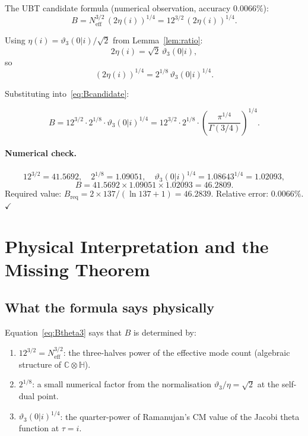 \documentclass[12pt,a4paper]{article}
\theoremstyle{remark}
\begin{document}
The UBT candidate formula (numerical observation, accuracy $0.0066\%$):
\begin{equation}
  B = N_{\mathrm{eff}}^{3/2}\,(2\eta(i))^{1/4}
  = 12^{3/2}\,(2\eta(i))^{1/4}.
  \label{eq:Bcandidate}
\end{equation}

Using $\eta(i) = \vartheta_3(0|i)/\sqrt{2}$ from Lemma~\ref{lem:ratio}:
\begin{equation}
  2\eta(i) = \sqrt{2}\,\vartheta_3(0|i),
\end{equation}
so
\begin{equation}
  (2\eta(i))^{1/4} = 2^{1/8}\,\vartheta_3(0|i)^{1/4}.
\end{equation}

Substituting into~\eqref{eq:Bcandidate}:
\begin{tcolorbox}[colback=blue!3!white, colframe=blue!55!black,
  title={Algebraic rewriting of the $B$-formula}]
\begin{equation}
  \boxed{
  B = 12^{3/2}\cdot 2^{1/8}\cdot\vartheta_3(0|i)^{1/4}
    = 12^{3/2}\cdot 2^{1/8}\cdot
      \left(\frac{\pi^{1/4}}{\Gamma(3/4)}\right)^{1/4}.
  }
  \label{eq:Btheta3}
\end{equation}
\end{tcolorbox}

\paragraph{Numerical check.}
\[
12^{3/2} = 41.5692,
\quad
2^{1/8} = 1.09051,
\quad
\vartheta_3(0|i)^{1/4} = 1.08643^{1/4} = 1.02093,
\]
\[
B = 41.5692 \times 1.09051 \times 1.02093 = 46.2809.
\]
Required value: $B_{\mathrm{req}} = 2\times137/(\ln 137+1) = 46.2839$.
Relative error: $0.0066\%$. $\checkmark$

\section{Physical Interpretation and the Missing Theorem}
\label{sec:missing}

\subsection{What the formula says physically}

Equation~\eqref{eq:Btheta3} says that $B$ is determined by:
\begin{enumerate}
  \item $12^{3/2} = N_{\mathrm{eff}}^{3/2}$: the three-halves power of the
        effective mode count (algebraic structure of $\mathbb{C}\otimes\mathbb{H}$).
  \item $2^{1/8}$: a small numerical factor from the normalisation
        $\vartheta_3/\eta = \sqrt{2}$ at the self-dual point.
  \item $\vartheta_3(0|i)^{1/4}$: the quarter-power of Ramanujan's
        CM value of the Jacobi theta function at $\tau=i$.
\end{enumerate}
\end{document}
